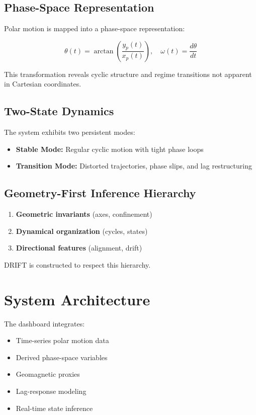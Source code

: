 \documentclass[11pt]{article}
\begin{document}
\subsection{Phase-Space Representation}

Polar motion is mapped into a phase-space representation:

\begin{equation}
\theta(t) = \arctan\left(\frac{y_p(t)}{x_p(t)}\right), \quad \omega(t) = \frac{d\theta}{dt}
\end{equation}

This transformation reveals cyclic structure and regime transitions not apparent in Cartesian coordinates.

\subsection{Two-State Dynamics}

The system exhibits two persistent modes:

\begin{itemize}
\item \textbf{Stable Mode:} Regular cyclic motion with tight phase loops
\item \textbf{Transition Mode:} Distorted trajectories, phase slips, and lag restructuring
\end{itemize}

\subsection{Geometry-First Inference Hierarchy}

\begin{enumerate}
\item \textbf{Geometric invariants} (axes, confinement)
\item \textbf{Dynamical organization} (cycles, states)
\item \textbf{Directional features} (alignment, drift)
\end{enumerate}

DRIFT is constructed to respect this hierarchy.

\section{System Architecture}

The dashboard integrates:

\begin{itemize}
\item Time-series polar motion data
\item Derived phase-space variables
\item Geomagnetic proxies
\item Lag-response modeling
\item Real-time state inference
\end{itemize}
\end{document}
